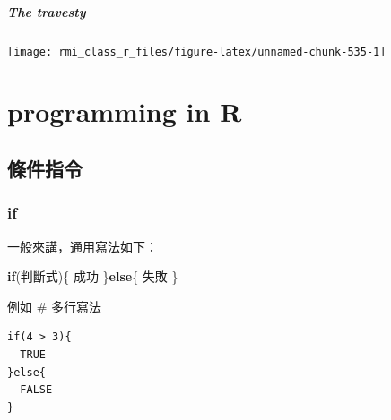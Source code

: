 \documentclass[]{book}
\newenvironment{Shaded}{\begin{snugshade}}{\end{snugshade}}
\newcommand{\ControlFlowTok}[1]{\textcolor[rgb]{0.13,0.29,0.53}{\textbf{#1}}}
\newcommand{\DataTypeTok}[1]{\textcolor[rgb]{0.13,0.29,0.53}{#1}}
\newcommand{\KeywordTok}[1]{\textcolor[rgb]{0.13,0.29,0.53}{\textbf{#1}}}
\newcommand{\NormalTok}[1]{#1}
\newcommand{\OperatorTok}[1]{\textcolor[rgb]{0.81,0.36,0.00}{\textbf{#1}}}
\newcommand{\StringTok}[1]{\textcolor[rgb]{0.31,0.60,0.02}{#1}}
\let\oldparagraph\paragraph
\renewcommand{\paragraph}[1]{\oldparagraph{#1}\mbox{}}
\theoremstyle{definition}
\theoremstyle{definition}
\theoremstyle{definition}
\theoremstyle{remark}
\begin{document}
\hypertarget{the-travesty}{%
\paragraph{The travesty}\label{the-travesty}}

\begin{Shaded}
\end{Shaded}

\begin{center}\texttt{[image: rmi\_class\_r\_files/figure-latex/unnamed-chunk-535-1]} \end{center}

\hypertarget{programming-in-r}{%
\chapter{programming in R}\label{programming-in-r}}

\section{條件指令}

\hypertarget{if}{%
\subsection{if}\label{if}}

一般來講，通用寫法如下：

\begin{Shaded}
\begin{Highlighting}[]
\ControlFlowTok{if}\NormalTok{(判斷式)\{}
\NormalTok{ 成功}
\NormalTok{\}}\ControlFlowTok{else}\NormalTok{\{}
\NormalTok{ 失敗}
\NormalTok{\}}
\end{Highlighting}
\end{Shaded}

例如 \# 多行寫法

\begin{verbatim}
if(4 > 3){
  TRUE
}else{
  FALSE
}
\end{verbatim}
\end{document}
